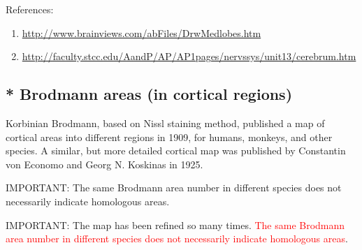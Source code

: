 




References:
\begin{enumerate}
\item \url{http://www.brainviews.com/abFiles/DrwMedlobes.htm}
\item \url{http://faculty.stcc.edu/AandP/AP/AP1pages/nervssys/unit13/cerebrum.htm}
\end{enumerate}

\subsection{* Brodmann areas (in cortical regions)}
\label{sec:area_in_brain}
\label{sec:Brodmann_area}

Korbinian Brodmann, based on Nissl staining method, published a map of cortical
areas into different regions in 1909, for humans, monkeys, and other species.
A similar, but more detailed cortical map was published by Constantin von
Economo and Georg N. Koskinas in 1925.

IMPORTANT: The same Brodmann area number in different species does not
necessarily indicate homologous areas.

IMPORTANT: The map has been refined so many times.
\textcolor{red}{The same Brodmann area number in different species does not
necessarily indicate homologous areas}.

